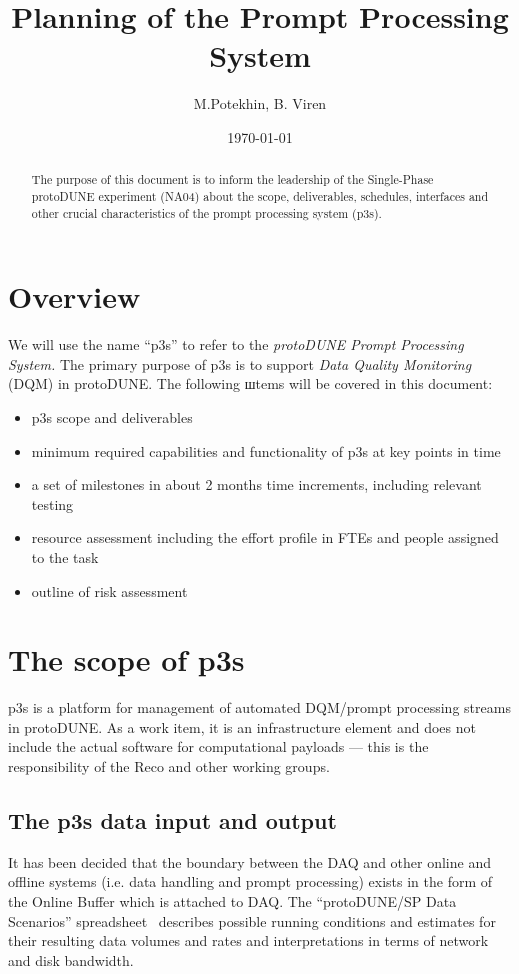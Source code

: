 \documentclass[pdftex,12pt,letter]{article}
\title{Planning of the \pd Prompt Processing System}
\date{\today}
\author{M.Potekhin, B. Viren}
\newcommand{\pd}{protoDUNE\xspace}
\begin{document}

\maketitle

\begin{abstract}
\noindent The purpose of this document is to inform the leadership
of the Single-Phase \pd experiment (NA04) about the scope, deliverables,
schedules, interfaces and other crucial characteristics of the prompt processing
system (p3s).
\end{abstract}


\pagebreak

\section{Overview}
We will use the name ``p3s'' to refer to the \textit{\pd Prompt Processing System.}
The primary purpose of p3s is to support \textit{Data Quality Monitoring} (DQM) in \pd.
The following шtems will be covered in this document:
\begin{itemize}
\item p3s scope and deliverables
\item minimum required capabilities and functionality of p3s at key points in time 

\item a set of milestones in about 2 months time increments, including relevant testing

\item resource assessment including the effort profile in FTEs and people assigned to the task

\item outline of risk assessment 
\end{itemize}


\section{The scope of p3s}
p3s is a platform for management of automated DQM/prompt processing streams
in \pd. As a work item, it is an infrastructure element and does not include the actual software for
computational payloads --- this is the responsibility of the Reco and other working groups.

\subsection{The p3s data input and output}
It has been decided that the boundary between the DAQ and other online and
offline systems
(i.e. data handling and prompt processing) exists in the form of the Online Buffer
which is attached to DAQ. 
The ``\pd/SP Data Scenarios'' spreadsheet~\cite{docdb1086}
describes  possible running conditions and estimates for their
resulting data volumes and rates and interpretations in terms of
network and disk bandwidth. 
\end{document}
